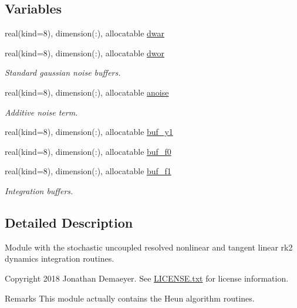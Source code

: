 \subsection*{Variables}
\begin{DoxyCompactItemize}
\item 
real(kind=8), dimension(\+:), allocatable \hyperlink{namespacerk2__ss__integrator_aa9dc56a3ff3887caced809dcb0257a1b}{dwar}
\item 
real(kind=8), dimension(\+:), allocatable \hyperlink{namespacerk2__ss__integrator_aeae3507fa2e319b59923f21622b58fc7}{dwor}
\begin{DoxyCompactList}\small\item\em Standard gaussian noise buffers. \end{DoxyCompactList}\item 
real(kind=8), dimension(\+:), allocatable \hyperlink{namespacerk2__ss__integrator_a26f660bf2b4b250a831c9fe4dc6c7726}{anoise}
\begin{DoxyCompactList}\small\item\em Additive noise term. \end{DoxyCompactList}\item 
real(kind=8), dimension(\+:), allocatable \hyperlink{namespacerk2__ss__integrator_a8b6b195712dd95f7eafe269379aa9dcc}{buf\+\_\+y1}
\item 
real(kind=8), dimension(\+:), allocatable \hyperlink{namespacerk2__ss__integrator_aebce0ce5ca95ff293f219a8f85d44851}{buf\+\_\+f0}
\item 
real(kind=8), dimension(\+:), allocatable \hyperlink{namespacerk2__ss__integrator_a1ffae309b7f72f07c598ab1882634ab3}{buf\+\_\+f1}
\begin{DoxyCompactList}\small\item\em Integration buffers. \end{DoxyCompactList}\end{DoxyCompactItemize}


\subsection{Detailed Description}
Module with the stochastic uncoupled resolved nonlinear and tangent linear rk2 dynamics integration routines. 

\begin{DoxyCopyright}{Copyright}
2018 Jonathan Demaeyer. See \hyperlink{LICENSE_8txt}{L\+I\+C\+E\+N\+S\+E.\+txt} for license information. 
\end{DoxyCopyright}
\begin{DoxyRemark}{Remarks}
This module actually contains the Heun algorithm routines. 
\end{DoxyRemark}


